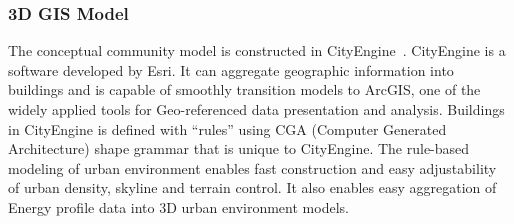 \documentclass[hidelinks,12pt]{article}
\begin{document}
\subsubsection{3D GIS Model}
The conceptual community model is constructed in
CityEngine~\cite{cityEngine2015}. CityEngine is a software developed
by Esri. It can aggregate geographic information into buildings and is
capable of smoothly transition models to ArcGIS\cite{ArcGIS2015}, one
of the widely applied tools for Geo-referenced data presentation and
analysis. Buildings in CityEngine is defined with ``rules'' using CGA
(Computer Generated Architecture) shape grammar that is unique to
CityEngine. The rule-based modeling of urban environment enables fast
construction and easy adjustability of urban density, skyline and
terrain control. It also enables easy aggregation of Energy profile
data into 3D urban environment models.
\end{document}
